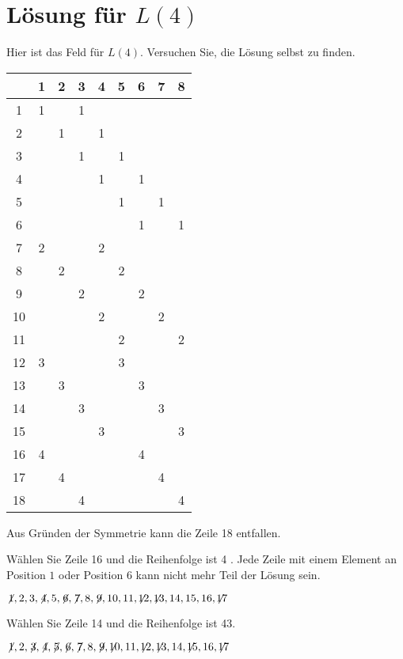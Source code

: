 \section{Lösung für $L(4)$}\label{s.langford-four}


Hier ist das Feld für $L(4)$. Versuchen Sie, die Lösung selbst zu finden.
\begin{center}
\addtolength{\tabcolsep}{4pt}
\begin{tabular}{|c||c|c|c|c|c|c|c|c|}
\hline
&1&2&3&4&5&6&7&8\\\hline\hline
1&1&&1&&&&&\\\hline
2&&1&&1&&&&\\\hline
3&&&1&&1&&&\\\hline
4&&&&1&&1&&\\\hline
5&&&&&1&&1&\\\hline
6&&&&&&1&&1\\\hline
7&2&&&2&&&&\\\hline
8&&2&&&2&&&\\\hline
9&&&2&&&2&&\\\hline
10&&&&2&&&2&\\\hline
11&&&&&2&&&2\\\hline
12&3&&&&3&&&\\\hline
13&&3&&&&3&&\\\hline
14&&&3&&&&3&\\\hline
15&&&&3&&&&3\\\hline
16&4&&&&&4&&\\\hline
17&&4&&&&&4&\\\hline
18&&&4&&&&&4\\\hline
\end{tabular}
\end{center}
Aus Gründen der Symmetrie kann die Zeile 18 entfallen.

\smallskip

\noindent Wählen Sie Zeile 16 und die Reihenfolge ist 4\textvisiblespace\textvisiblespace\textvisiblespace{} \textvisiblespace\textvisiblespace.
Jede Zeile mit einem Element an Position $1$ oder Position $6$ kann nicht mehr Teil der Lösung sein.

$\not\! 1,2,3,\not\! 4,5,\not\! 6,\not\! 7,8,\not\! 9,10,11,\not\!\! 12,\not\!\! 13,14,15,16,\not\!\! 17$

\noindent Wählen Sie Zeile 14 und die Reihenfolge ist 4\textvisiblespace{}3\textvisiblespace.

$\not\! 1,2,\not\! 3,\not\! 4,\not\! 5,\not\! 6,\not\! 7,8,\not\! 9,\not\!\! 10,11,\not\!\! 12,\not\!\! 13,14, \not\!\! 15,16,\not\!\! 17$

